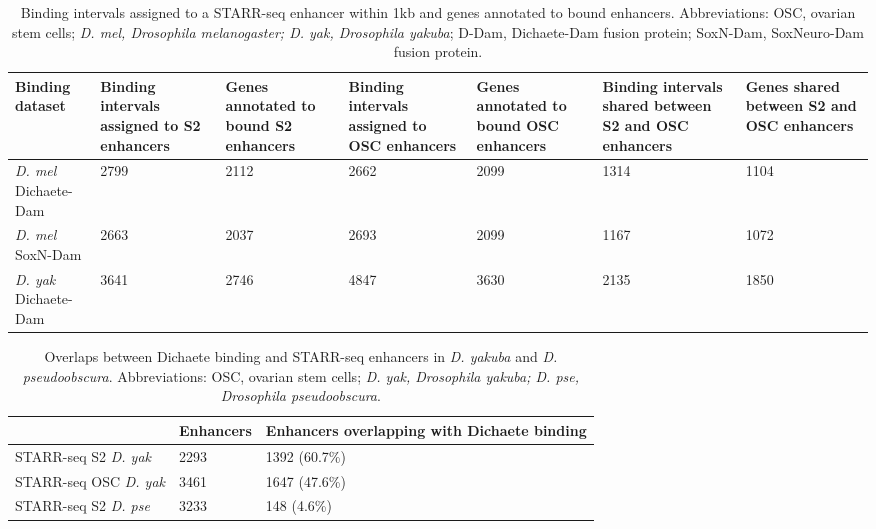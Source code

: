 \begin{table}[h]
\centering
\begin{tabular}{|p{1.5cm}|p{2cm}|p{1.5cm}|p{2cm}|p{2cm}|p{2cm}|p{1.5cm}|}
\hline
\textbf{Binding dataset}     & \textbf{Binding intervals assigned to S2 enhancers} & \textbf{Genes annotated to bound S2 enhancers} & \textbf{Binding intervals assigned to OSC enhancers} & \textbf{Genes annotated to bound OSC enhancers} & \textbf{Binding intervals shared between S2 and OSC enhancers} & \textbf{Genes shared between S2 and OSC enhancers} \\ \hline
\emph{D. mel} Dichaete-Dam & 2799                                       & 2112                                  & 2662                                        & 2099                                   & 1314                                                  & 1104                                      \\ \hline
\emph{D. mel} SoxN-Dam     & 2663                                       & 2037                                  & 2693                                        & 2099                                   & 1167                                                  & 1072                                      \\ \hline
\emph{D. yak} Dichaete-Dam & 3641                                       & 2746                                  & 4847                                        & 3630                                   & 2135                                                  & 1850                                      \\ \hline
\end{tabular}
\caption{Binding intervals assigned to a STARR-seq enhancer within 1kb and genes annotated to bound enhancers. Abbreviations: OSC, ovarian stem cells; \emph{D. mel, Drosophila melanogaster; D. yak, Drosophila yakuba}; D-Dam, Dichaete-Dam fusion protein; SoxN-Dam, SoxNeuro-Dam fusion protein.}
\label{Table 4.10}
\end{table}

\begin{table}[h]
\centering
\begin{tabular}{|l|l|p{6cm}|}
\hline
                     & \textbf{Enhancers} & \textbf{Enhancers overlapping with Dichaete binding} \\ \hline
STARR-seq S2 \emph{D. yak}  & 2293      & 1392 (60.7\%)                               \\ \hline
STARR-seq OSC \emph{D. yak} & 3461      & 1647 (47.6\%)                               \\ \hline
STARR-seq S2 \emph{D. pse}  & 3233      & 148 (4.6\%)                                 \\ \hline
\end{tabular}
\caption{Overlaps between Dichaete binding and STARR-seq enhancers in \emph{D. yakuba} and \emph{D. pseudoobscura}. Abbreviations: OSC, ovarian stem cells; \emph{D. yak, Drosophila yakuba; D. pse, Drosophila pseudoobscura}.}
\label{Table 4.11}
\end{table}


